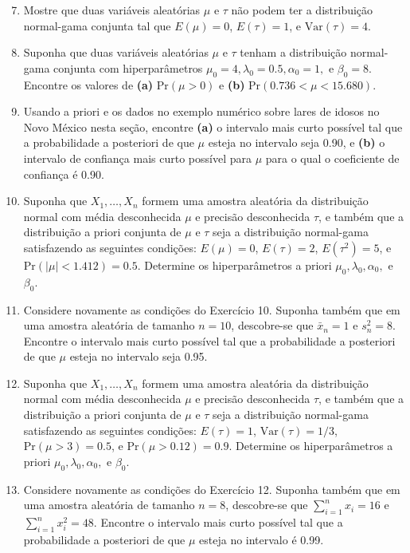 \begin{enumerate}
    \setcounter{enumi}{6} %
    \item Mostre que duas variáveis aleatórias $\mu$ e $\tau$ não podem ter a distribuição normal-gama conjunta tal que $E(\mu) = 0$, $E(\tau) = 1$, e $\text{Var}(\tau) = 4$.

    \item Suponha que duas variáveis aleatórias $\mu$ e $\tau$ tenham a distribuição normal-gama conjunta com hiperparâmetros $\mu_0 = 4, \lambda_0 = 0.5, \alpha_0 = 1,$ e $\beta_0 = 8$. Encontre os valores de \textbf{(a)} $\text{Pr}(\mu > 0)$ e \textbf{(b)} $\text{Pr}(0.736 < \mu < 15.680)$.

    \item Usando a priori e os dados no exemplo numérico sobre lares de idosos no Novo México nesta seção, encontre \textbf{(a)} o intervalo mais curto possível tal que a probabilidade a posteriori de que $\mu$ esteja no intervalo seja 0.90, e \textbf{(b)} o intervalo de confiança mais curto possível para $\mu$ para o qual o coeficiente de confiança é 0.90.

    \item Suponha que $X_1, \dots, X_n$ formem uma amostra aleatória da distribuição normal com média desconhecida $\mu$ e precisão desconhecida $\tau$, e também que a distribuição a priori conjunta de $\mu$ e $\tau$ seja a distribuição normal-gama satisfazendo as seguintes condições: $E(\mu) = 0$, $E(\tau) = 2$, $E(\tau^2) = 5$, e $\text{Pr}(|\mu| < 1.412) = 0.5$. Determine os hiperparâmetros a priori $\mu_0, \lambda_0, \alpha_0,$ e $\beta_0$.

    \item Considere novamente as condições do Exercício 10. Suponha também que em uma amostra aleatória de tamanho $n=10$, descobre-se que $\bar{x}_n = 1$ e $s_n^2 = 8$. Encontre o intervalo mais curto possível tal que a probabilidade a posteriori de que $\mu$ esteja no intervalo seja 0.95.

    \item Suponha que $X_1, \dots, X_n$ formem uma amostra aleatória da distribuição normal com média desconhecida $\mu$ e precisão desconhecida $\tau$, e também que a distribuição a priori conjunta de $\mu$ e $\tau$ seja a distribuição normal-gama satisfazendo as seguintes condições: $E(\tau) = 1$, $\text{Var}(\tau) = 1/3$, $\text{Pr}(\mu > 3) = 0.5$, e $\text{Pr}(\mu > 0.12) = 0.9$. Determine os hiperparâmetros a priori $\mu_0, \lambda_0, \alpha_0,$ e $\beta_0$.

    \item Considere novamente as condições do Exercício 12. Suponha também que em uma amostra aleatória de tamanho $n=8$, descobre-se que $\sum_{i=1}^n x_i = 16$ e $\sum_{i=1}^n x_i^2 = 48$. Encontre o intervalo mais curto possível tal que a probabilidade a posteriori de que $\mu$ esteja no intervalo é 0.99.

\end{enumerate}

